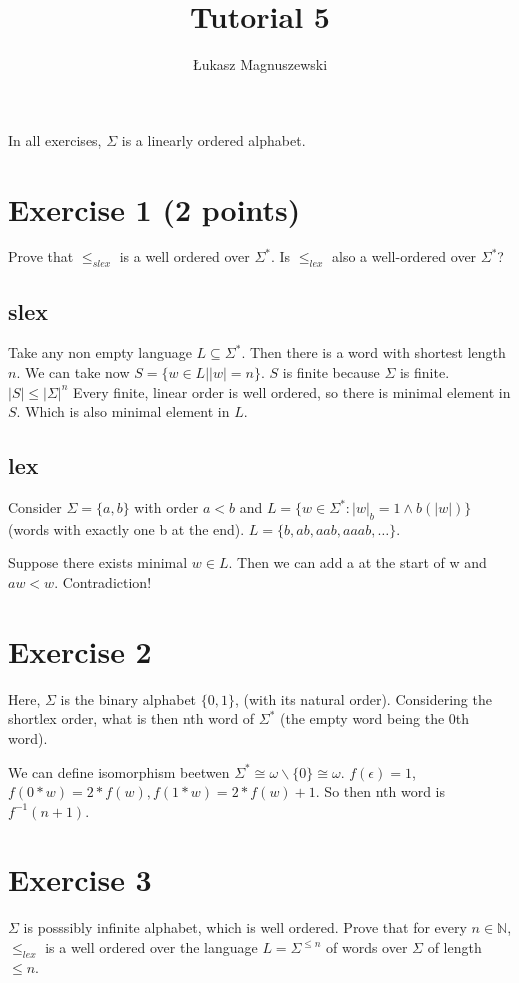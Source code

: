 \documentclass{article}
\author{Łukasz Magnuszewski}
\title{Tutorial 5}
\begin{document}
\maketitle
In all exercises, $\Sigma$ is a linearly ordered alphabet.
\section*{Exercise 1 (2 points)}
Prove that $\leq_{slex}$ is a well ordered over $\Sigma^*$. Is $\leq_{lex}$ also a well-ordered over $\Sigma^*$?

\subsection*{slex}
Take any non empty language $L \subseteq \Sigma^*$. Then there is a word with shortest length $n$.
We can take now $S = \{ w \in L | |w| = n \}$. $S$ is finite because $\Sigma$ is finite. $|S| \leq |\Sigma|^n$
Every finite, linear order is well ordered, so there is minimal element in $S$. Which is also minimal element in $L$.

\subsection*{lex}
Consider $\Sigma = \{a, b \}$ with order $a < b$ and $L = \{w \in \Sigma^* : |w|_b = 1 \land b(|w|)  \}$(words with exactly one b at the end). $L = \{b, ab, aab, aaab, \ldots \}$.

Suppose there exists minimal $w \in L$. Then we can add a at the start of w and $aw < w$. Contradiction!

\section*{Exercise 2}
Here, $\Sigma$ is the binary alphabet $\{0, 1\}$, (with its natural order). 
Considering the shortlex order, what is then nth word of $\Sigma^*$ (the empty word being the 0th word).

We can define isomorphism beetwen $\Sigma^* \cong \omega \backslash \{0\} \cong \omega$. 
$f(\epsilon) = 1$, $f(0 * w) = 2 * f(w), f(1 * w) = 2 * f(w) + 1$. So then nth word is $f^{-1}(n+1)$.


\section*{Exercise 3}
$\Sigma$ is posssibly infinite alphabet, which is well ordered. Prove that for every $n \in \mathbb{N}$, $\leq_{lex}$ is a well ordered over the language $L = \Sigma^{\leq n}$ of words over $\Sigma$ of length $\leq n$.
\end{document}
